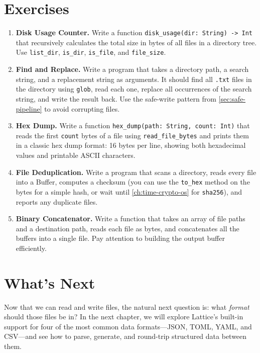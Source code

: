 \section*{Exercises}\label{sec:filesystem-exercises}

\begin{enumerate}
    \item \textbf{Disk Usage Counter.} Write a function
    \lstinline|disk_usage(dir: String) -> Int| that recursively calculates
    the total size in bytes of all files in a directory tree. Use
    \lstinline|list_dir|, \lstinline|is_dir|, \lstinline|is_file|, and
    \lstinline|file_size|.

    \item \textbf{Find and Replace.} Write a program that takes a directory
    path, a search string, and a replacement string as arguments. It should
    find all \texttt{.txt} files in the directory using \lstinline|glob|,
    read each one, replace all occurrences of the search string, and write
    the result back. Use the safe-write pattern from
    \cref{sec:safe-pipeline} to avoid corrupting files.

    \item \textbf{Hex Dump.} Write a function
    \lstinline|hex_dump(path: String, count: Int)| that reads the first
    \lstinline|count| bytes of a file using \lstinline|read_file_bytes| and
    prints them in a classic hex dump format: 16 bytes per line, showing
    both hexadecimal values and printable ASCII characters.

    \item \textbf{File Deduplication.} Write a program that scans a
    directory, reads every file into a Buffer, computes a checksum (you can
    use the \lstinline|to_hex| method on the bytes for a simple hash, or
    wait until \cref{ch:time-crypto-os} for \lstinline|sha256|), and
    reports any duplicate files.

    \item \textbf{Binary Concatenator.} Write a function that takes an array
    of file paths and a destination path, reads each file as bytes, and
    concatenates all the buffers into a single file. Pay attention to
    building the output buffer efficiently.
\end{enumerate}

\section*{What's Next}\label{sec:filesystem-next}

Now that we can read and write files, the natural next question is: what
\emph{format} should those files be in? In the next chapter, we will explore
Lattice's built-in support for four of the most common data formats---JSON,
TOML, YAML, and CSV---and see how to parse, generate, and round-trip
structured data between them.
